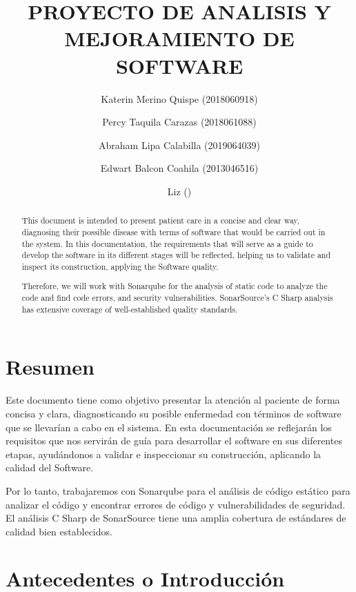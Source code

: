\documentclass[preprint,12pt,notitlepage]{elsarticle}
\begin{document}
	
	\begin{frontmatter}

		\title{\huge  PROYECTO DE  ANALISIS Y  MEJORAMIENTO DE  SOFTWARE }
		\author{Katerin Merino Quispe  (2018060918)}
		\author{Percy Taquila Carazas  (2018061088)}
		\author{Abraham Lipa Calabilla (2019064039)}
		\author{Edwart Balcon Coahila  (2013046516)}
		\author{Liz                ()}
		\address{Tacna, Perú}
		
\begin{abstract}
This document is intended to present patient care in a concise and clear way, diagnosing their possible disease with terms of software that would be carried out in the system. In this documentation, the requirements that will serve as a guide to develop the software in its different stages will be reflected, helping us to validate and inspect its construction, applying the Software quality.

Therefore, we will work with Sonarqube for the analysis of static code to analyze the code and find code errors, and security vulnerabilities. SonarSource's C Sharp analysis has extensive coverage of well-established quality standards.  
\end{abstract}

\end{frontmatter}

\section*{Resumen}

Este documento tiene como objetivo presentar la atención al paciente de forma concisa y clara, diagnosticando su posible enfermedad con términos de software que se llevarían a cabo en el sistema. En esta documentación se reflejarán los requisitos que nos servirán de guía para desarrollar el software en sus diferentes etapas, ayudándonos a validar e inspeccionar su construcción, aplicando la calidad del Software.

Por lo tanto, trabajaremos con Sonarqube para el análisis de código estático para analizar el código y encontrar errores de código y vulnerabilidades de seguridad. El análisis C Sharp de SonarSource tiene una amplia cobertura de estándares de calidad bien establecidos.

\section{Antecedentes o Introducción}
\end{document}
